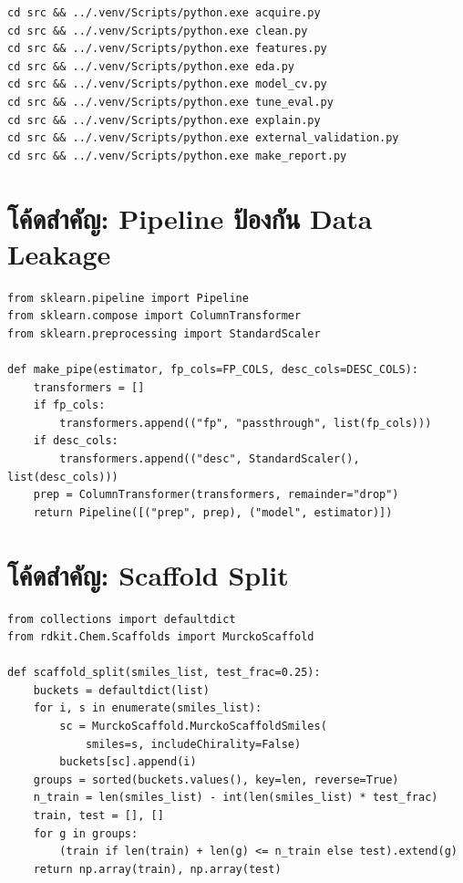 \begingroup\scriptsize
\begin{verbatim}
cd src && ../.venv/Scripts/python.exe acquire.py
cd src && ../.venv/Scripts/python.exe clean.py
cd src && ../.venv/Scripts/python.exe features.py
cd src && ../.venv/Scripts/python.exe eda.py
cd src && ../.venv/Scripts/python.exe model_cv.py
cd src && ../.venv/Scripts/python.exe tune_eval.py
cd src && ../.venv/Scripts/python.exe explain.py
cd src && ../.venv/Scripts/python.exe external_validation.py
cd src && ../.venv/Scripts/python.exe make_report.py
\end{verbatim}
\endgroup

\section{โค้ดสำคัญ: Pipeline ป้องกัน Data Leakage}

\begingroup\scriptsize
\begin{verbatim}
from sklearn.pipeline import Pipeline
from sklearn.compose import ColumnTransformer
from sklearn.preprocessing import StandardScaler

def make_pipe(estimator, fp_cols=FP_COLS, desc_cols=DESC_COLS):
    transformers = []
    if fp_cols:
        transformers.append(("fp", "passthrough", list(fp_cols)))
    if desc_cols:
        transformers.append(("desc", StandardScaler(), list(desc_cols)))
    prep = ColumnTransformer(transformers, remainder="drop")
    return Pipeline([("prep", prep), ("model", estimator)])
\end{verbatim}
\endgroup

\section{โค้ดสำคัญ: Scaffold Split}

\begingroup\scriptsize
\begin{verbatim}
from collections import defaultdict
from rdkit.Chem.Scaffolds import MurckoScaffold

def scaffold_split(smiles_list, test_frac=0.25):
    buckets = defaultdict(list)
    for i, s in enumerate(smiles_list):
        sc = MurckoScaffold.MurckoScaffoldSmiles(
            smiles=s, includeChirality=False)
        buckets[sc].append(i)
    groups = sorted(buckets.values(), key=len, reverse=True)
    n_train = len(smiles_list) - int(len(smiles_list) * test_frac)
    train, test = [], []
    for g in groups:
        (train if len(train) + len(g) <= n_train else test).extend(g)
    return np.array(train), np.array(test)
\end{verbatim}
\endgroup

